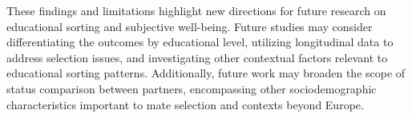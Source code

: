 These findings and limitations highlight new directions for future research on educational sorting and subjective well-being. Future studies may consider differentiating the outcomes by educational level, utilizing longitudinal data to address selection issues, and investigating other contextual factors relevant to educational sorting patterns. Additionally, future work may broaden the scope of status comparison between partners, encompassing other sociodemographic characteristics important to mate selection and contexts beyond Europe.
